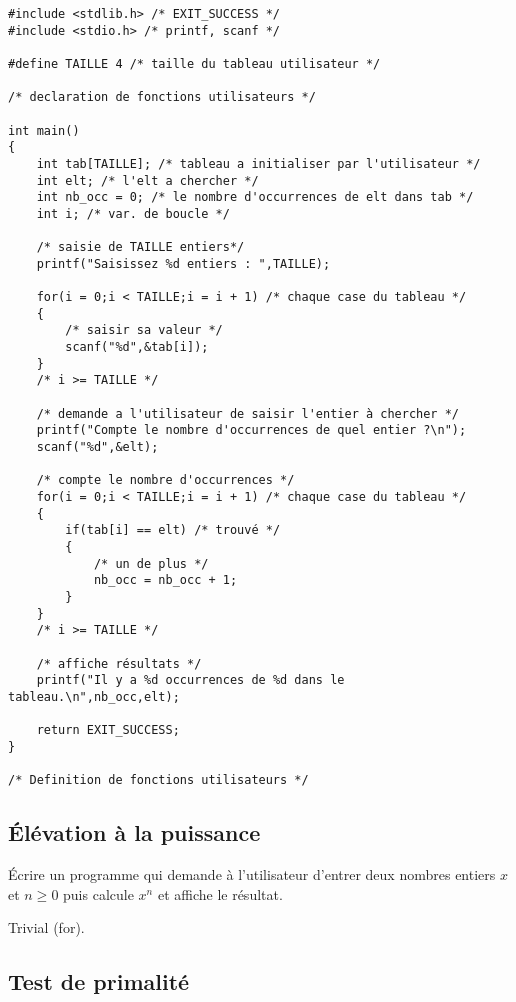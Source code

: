 \begin{correction}
\begin{verbatim}
#include <stdlib.h> /* EXIT_SUCCESS */
#include <stdio.h> /* printf, scanf */

#define TAILLE 4 /* taille du tableau utilisateur */

/* declaration de fonctions utilisateurs */

int main()
{
    int tab[TAILLE]; /* tableau a initialiser par l'utilisateur */
    int elt; /* l'elt a chercher */
    int nb_occ = 0; /* le nombre d'occurrences de elt dans tab */
    int i; /* var. de boucle */

    /* saisie de TAILLE entiers*/
    printf("Saisissez %d entiers : ",TAILLE);

    for(i = 0;i < TAILLE;i = i + 1) /* chaque case du tableau */
    {
        /* saisir sa valeur */
        scanf("%d",&tab[i]);
    }
    /* i >= TAILLE */

    /* demande a l'utilisateur de saisir l'entier à chercher */
    printf("Compte le nombre d'occurrences de quel entier ?\n");
    scanf("%d",&elt);

    /* compte le nombre d'occurrences */
    for(i = 0;i < TAILLE;i = i + 1) /* chaque case du tableau */
    {
        if(tab[i] == elt) /* trouvé */
        {
            /* un de plus */
            nb_occ = nb_occ + 1;
        }
    }
    /* i >= TAILLE */

    /* affiche résultats */
    printf("Il y a %d occurrences de %d dans le tableau.\n",nb_occ,elt);

    return EXIT_SUCCESS;
}

/* Definition de fonctions utilisateurs */

\end{verbatim}
\end{correction}


\subsection{Élévation à la puissance}

Écrire un programme qui demande à l'utilisateur d'entrer deux nombres
entiers $x$ et $n \geq 0$ puis calcule $x^n$ et affiche le résultat.
\begin{correction}
Trivial (for).
\end{correction}
\subsection{Test de primalité}

